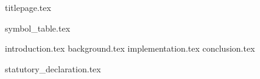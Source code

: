 \documentclass[10pt,fleqn,twoside,ngerman]{article}
\begin{document}
  {titlepage.tex}

  \setcounter{page}{0}
  {symbol_table.tex}
  \tableofcontents

  \cleardoublepage
  {introduction.tex}
  {background.tex}
  {implementation.tex}
  {conclusion.tex}

  \nocite{*}
  
  

  \cleardoublepage
  \appendix

  \cleardoublepage
  {statutory_declaration.tex}
\end{document}
